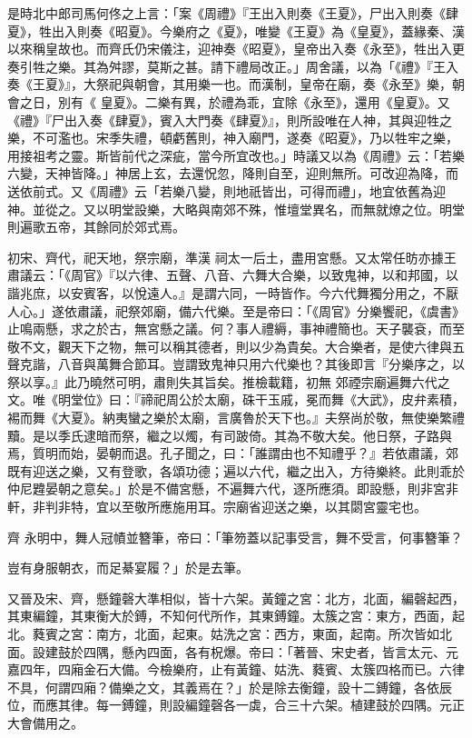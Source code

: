 \begin{pinyinscope}
 是時北中郎司馬何佟之上言：「案《周禮》『王出入則奏《王夏》，尸出入則奏《肆夏》，牲出入則奏《昭夏》。今樂府之《夏》，唯變《王夏》為《皇夏》，蓋緣秦、漢以來稱皇故也。而齊氏仍宋儀注，迎神奏《昭夏》，皇帝出入奏《永至》，牲出入更奏引牲之樂。其為舛謬，莫斯之甚。請下禮局改正。」周舍議，以為「《禮》『王入奏《王夏》』，大祭祀與朝會，其用樂一也。而漢制，皇帝在廟，奏《永至》樂，朝會之日，別有《
 皇夏》。二樂有異，於禮為乖，宜除《永至》，還用《皇夏》。又《禮》『尸出入奏《肆夏》，賓入大門奏《肆夏》』，則所設唯在人神，其與迎牲之樂，不可濫也。宋季失禮，頓虧舊則，神入廟門，遂奏《昭夏》，乃以牲牢之樂，用接祖考之靈。斯皆前代之深疵，當今所宜改也。」時議又以為《周禮》云：「若樂六變，天神皆降。」神居上玄，去還怳忽，降則自至，迎則無所。可改迎為降，而送依前式。又《周禮》云「若樂八變，則地祇皆出，可得而禮」，地宜依舊為迎神。並從之。又以明堂設樂，大略與南郊不殊，惟壇堂異名，而無就燎之位。明堂則遍歌五帝，其餘同於郊式焉。



 初宋、齊代，祀天地，祭宗廟，準漢
 祠太一后土，盡用宮懸。又太常任昉亦據王肅議云：「《周官》『以六律、五聲、八音、六舞大合樂，以致鬼神，以和邦國，以諧兆庶，以安賓客，以悅遠人。』是謂六同，一時皆作。今六代舞獨分用之，不厭人心。」遂依肅議，祀祭郊廟，備六代樂。至是帝曰：「《周官》分樂饗祀，《虞書》止鳴兩懸，求之於古，無宮懸之議。何？事人禮縟，事神禮簡也。天子襲袞，而至敬不文，觀天下之物，無可以稱其德者，則以少為貴矣。大合樂者，是使六律與五聲克諧，八音與萬舞合節耳。豈謂致鬼神只用六代樂也？其後即言『分樂序之，以祭以享。』此乃曉然可明，肅則失其旨矣。推檢載籍，初無
 郊禋宗廟遍舞六代之文。唯《明堂位》曰：『禘祀周公於太廟，硃干玉戚，冕而舞《大武》，皮弁素積，裼而舞《大夏》。納夷蠻之樂於太廟，言廣魯於天下也。』夫祭尚於敬，無使樂繁禮黷。是以季氏逮暗而祭，繼之以燭，有司跛倚。其為不敬大矣。他日祭，子路與焉，質明而始，晏朝而退。孔子聞之，曰：「誰謂由也不知禮乎？』若依肅議，郊既有迎送之樂，又有登歌，各頌功德；遍以六代，繼之出入，方待樂終。此則乖於仲尼韙晏朝之意矣。」於是不備宮懸，不遍舞六代，逐所應須。即設懸，則非宮非軒，非判非特，宜以至敬所應施用耳。宗廟省迎送之樂，以其閟宮靈宅也。



 齊
 永明中，舞人冠幘並簪筆，帝曰：「筆笏蓋以記事受言，舞不受言，何事簪筆？



 豈有身服朝衣，而足綦宴履？」於是去筆。



 又晉及宋、齊，懸鐘磬大準相似，皆十六架。黃鐘之宮：北方，北面，編磬起西，其東編鐘，其東衡大於鎛，不知何代所作，其東鎛鐘。太簇之宮：東方，西面，起北。蕤賓之宮：南方，北面，起東。姑洗之宮：西方，東面，起南。所次皆如北面。設建鼓於四隅，懸內四面，各有柷爆。帝曰：「著晉、宋史者，皆言太元、元嘉四年，四廂金石大備。今檢樂府，止有黃鐘、姑洗、蕤賓、太簇四格而已。六律不具，何謂四廂？備樂之文，其義焉在？」於是除去衡鐘，設十二鎛鐘，各依辰
 位，而應其律。每一鎛鐘，則設編鐘磬各一虡，合三十六架。植建鼓於四隅。元正大會備用之。




\end{pinyinscope}
